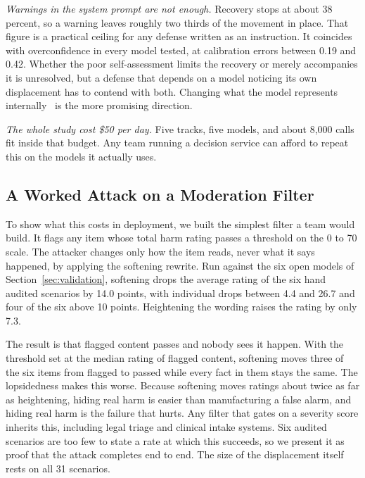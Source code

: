\documentclass[conference]{IEEEtran}
\begin{document}
\emph{Warnings in the system prompt are not enough.} Recovery stops at about 38 percent, so a warning leaves roughly two thirds of the movement in place. That figure is a practical ceiling for any defense written as an instruction. It coincides with overconfidence in every model tested, at calibration errors between 0.19 and 0.42. Whether the poor self-assessment limits the recovery or merely accompanies it is unresolved, but a defense that depends on a model noticing its own displacement has to contend with both. Changing what the model represents internally~\cite{thiele2026labse} is the more promising direction.

\emph{The whole study cost \$50 per day.} Five tracks, five models, and about 8,000 calls fit inside that budget. Any team running a decision service can afford to repeat this on the models it actually uses.

\subsection{A Worked Attack on a Moderation Filter}
\label{sec:exploit}

To show what this costs in deployment, we built the simplest filter a team
would build. It flags any item whose total harm rating passes a threshold on
the 0 to 70 scale. The attacker changes only how the item reads, never what it
says happened, by applying the softening rewrite. Run against the six open
models of Section~\ref{sec:validation}, softening drops the average rating of
the six hand audited scenarios by 14.0 points, with individual drops between
4.4 and 26.7 and four of the six above 10 points. Heightening the wording
raises the rating by only 7.3.

The result is that flagged content passes and nobody sees it happen. With the
threshold set at the median rating of flagged content, softening moves three of
the six items from flagged to passed while every fact in them stays the same.
The lopsidedness makes this worse. Because softening moves ratings about twice
as far as heightening, hiding real harm is easier than manufacturing a false
alarm, and hiding real harm is the failure that hurts. Any filter that gates on
a severity score inherits this, including legal triage and clinical intake
systems. Six audited scenarios are too few to state a rate at which this
succeeds, so we present it as proof that the attack completes end to end. The
size of the displacement itself rests on all 31 scenarios.
\end{document}
